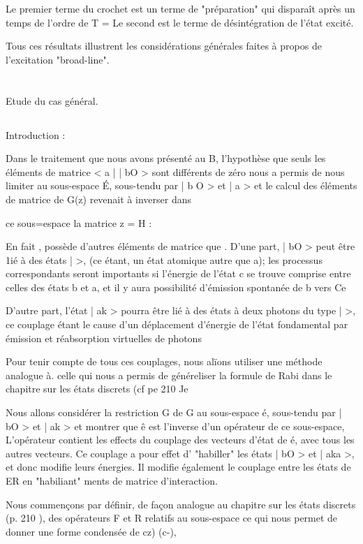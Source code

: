 Le premier terme du crochet est un terme de "préparation" qui
disparaît après un temps de l'ordre de T =  Le second est le terme de
désintégration de l'état excité.

Tous ces résultats illustrent les considérations générales faites à propos de l'excitation "broad-line".

\section{} Etude du cas général.%
\subsection{} Introduction :%

Dans le traitement que nous avons présenté au  B, l'hypothèse
que seuls les éléments de matrice < a | | bO > sont différents de zéro
nous a permis de nous limiter au sous-espace É, sous-tendu par | b O > et
| a > et le calcul des éléments de matrice de G(z) revenait à inverser dans

ce sous=espace la matrice z = H :

En fait , possède d'autres éléments de matrice que
.
D'une part, | bO > peut être 1ié à des états |  >, (ce étant,
un état atomique autre que a); les processus correspondants seront importants
si l'énergie de l'état c se trouve comprise entre celles des états b et a, et
il y aura possibilité d'émission spontanée de b vers Ce

D'autre part, l'état | ak > pourra être lié à des états à deux
photons du type |  >, ce couplage étant le cause d'un déplacement
d'énergie de l'état fondamental par émission et réabsorption virtuelles de
photons

Pour tenir compte de tous ces couplages, nous alïons utiliser
une méthode analogue à. celle qui nous a permis de généreliser la formule de
Rabi dans le chapitre sur les états discrets (cf pe 210 Je

Nous allons considérer la restriction G de G au sous-espace é,
sous-tendu par | bO > et | ak > et montrer que ê est l'inverse d'un opérateur
de ce sous-espace,  L'opérateur  contient les effects du couplage
des vecteurs d'état de é, avec tous les autres vecteurs. Ce couplage a pour
effet d' "habiller" les états | bO > et | aka >, et donc modifie leurs énergies.
Il modifie également le couplage entre les états de ER en "habiliant" 
ments de matrice d'interaction.

Nous commençons par définir, de façon analogue au chapitre sur
les états discrets (p. 210 ), des opérateurs F et R relatifs au sous-espace 
ce qui nous permet de donner une forme condensée de cz) (c-),

